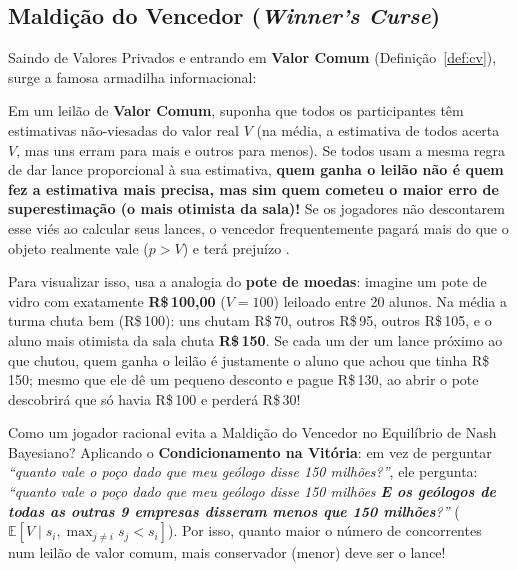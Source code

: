 \subsection{Maldição do Vencedor (\textit{Winner's Curse})}
\label{subsec:maldicao_vencedor}

Saindo de Valores Privados e entrando em \textbf{Valor Comum} (Definição~\ref{def:cv}), surge a famosa armadilha informacional:

\begin{definicao}
\label{def:maldicao_vencedor}
Em um leilão de \textbf{Valor Comum}, suponha que todos os participantes têm estimativas não-viesadas do valor real $V$ (na média, a estimativa de todos acerta $V$, mas uns erram para mais e outros para menos). Se todos usam a mesma regra de dar lance proporcional à sua estimativa, \textbf{quem ganha o leilão não é quem fez a estimativa mais precisa, mas sim quem cometeu o maior erro de superestimação (o mais otimista da sala)!} Se os jogadores não descontarem esse viés ao calcular seus lances, o vencedor frequentemente pagará mais do que o objeto realmente vale ($p > V$) e terá prejuízo \cite[p.~14]{klemperer2004}.
\end{definicao}

Para visualizar isso, \cite[p.~14 e 53]{klemperer2004} usa a analogia do \textbf{pote de moedas}: imagine um pote de vidro com exatamente \textbf{R\$\,100,00} ($V = 100$) leiloado entre 20 alunos. Na média a turma chuta bem (R\$\,100): uns chutam R\$\,70, outros R\$\,95, outros R\$\,105, e o aluno mais otimista da sala chuta \textbf{R\$\,150}. Se cada um der um lance próximo ao que chutou, quem ganha o leilão é justamente o aluno que achou que tinha R\$\,150; mesmo que ele dê um pequeno desconto e pague R\$\,130, ao abrir o pote descobrirá que só havia R\$\,100 e perderá R\$\,30!

Como um jogador racional evita a Maldição do Vencedor no Equilíbrio de Nash Bayesiano? Aplicando o \textbf{Condicionamento na Vitória}: em vez de perguntar \textit{``quanto vale o poço dado que meu geólogo disse 150 milhões?''}, ele pergunta: \textit{``quanto vale o poço dado que meu geólogo disse 150 milhões \textbf{E os geólogos de todas as outras 9 empresas disseram menos que 150 milhões}?''} ($\mathbb{E}[V \mid s_i, \max_{j \neq i} s_j < s_i]$). Por isso, quanto maior o número de concorrentes num leilão de valor comum, mais conservador (menor) deve ser o lance!

